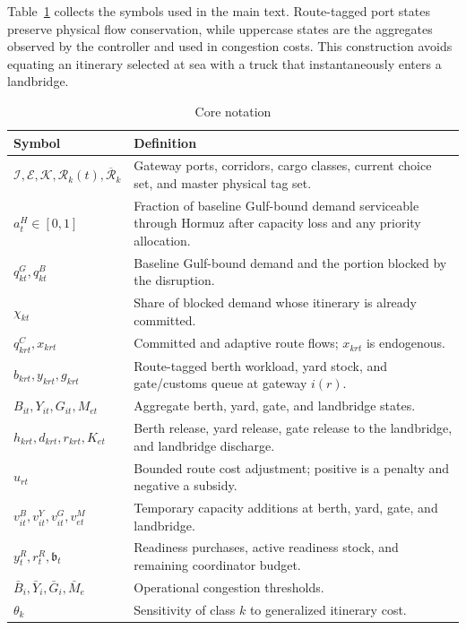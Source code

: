 \documentclass[a4paper,fleqn]{cas-sc}
\begin{document}
Table~\ref{tab:notation} collects the symbols used in the main text. Route-tagged
port states preserve physical flow conservation, while uppercase states are the
aggregates observed by the controller and used in congestion costs. This
construction avoids equating an itinerary selected at sea with a truck that
instantaneously enters a landbridge.

\begin{table}
\centering
\caption{Core notation}
\label{tab:notation}
\small
\begin{tabularx}{\textwidth}{@{}p{}X@{}}
\toprule
Symbol & Definition \\
\midrule
$\mathcal I,\mathcal E,\mathcal K,\mathcal R_k(t),\overline{\mathcal R}_k$ &
Gateway ports, corridors, cargo classes, current choice set, and master
physical tag set. \\
$a_t^H\in[0,1]$ & Fraction of baseline Gulf-bound demand serviceable through
Hormuz after capacity loss and any priority allocation. \\
$q^{G}_{kt},q^{B}_{kt}$ & Baseline Gulf-bound demand and the portion blocked by
the disruption. \\
$\chi_{kt}$ & Share of blocked demand whose itinerary is already committed. \\
$q^{C}_{krt},x_{krt}$ & Committed and adaptive route flows; $x_{krt}$ is
endogenous. \\
$b_{krt},y_{krt},g_{krt}$ & Route-tagged berth workload, yard stock, and
gate/customs queue at gateway $i(r)$. \\
$B_{it},Y_{it},G_{it},M_{et}$ & Aggregate berth, yard, gate, and landbridge
states. \\
$h_{krt},d_{krt},r_{krt},K_{et}$ & Berth release, yard release, gate release to
the landbridge, and landbridge discharge. \\
$u_{rt}$ & Bounded route cost adjustment; positive is a penalty and negative a
subsidy. \\
$v^B_{it},v^Y_{it},v^G_{it},v^M_{et}$ & Temporary capacity additions at berth,
yard, gate, and landbridge. \\
$y_t^R,r_t^R,\mathfrak b_t$ & Readiness purchases, active readiness stock, and
remaining coordinator budget. \\
$\bar B_i,\bar Y_i,\bar G_i,\bar M_e$ & Operational congestion thresholds. \\
$\theta_k$ & Sensitivity of class $k$ to generalized itinerary cost. \\
\bottomrule
\end{tabularx}
\end{table}
\end{document}
